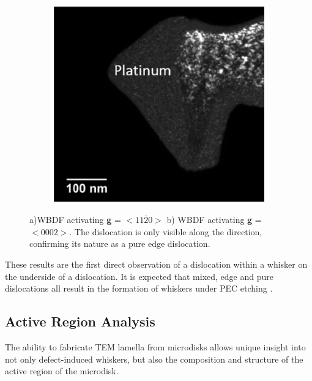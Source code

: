 \begin{figure}[h]
\begin{subfigure}[b]{0.48\textwidth}
	\end{subfigure}%
	\hspace*{0.5cm}
	\begin{subfigure}[b]{0.48\textwidth}
		\centering
		\includegraphics[width=1\linewidth]{Figs/Ch4/0002}
		\caption{}
	\end{subfigure}%
	
	\caption{a)WBDF activating \textbf{g} = $<11\bar{2}0>$  b) WBDF activating \textbf{g} = $<0002>$. The dislocation is only visible along the direction, confirming its nature as a pure edge dislocation.}
	\label{whiskerwbdf}
\end{figure}
\FloatBarrier

These results are the first direct observation of a dislocation within a whisker on the underside of a dislocation. It is expected that mixed, edge and pure dislocations all result in the formation of whiskers under PEC etching \cite{Youtsey1998,Lazar2004}.

\subsection{Active Region Analysis}

The ability to fabricate TEM lamella from microdisks allows unique insight into not only defect-induced whiskers, but also the composition and structure of the active region of the microdisk.

